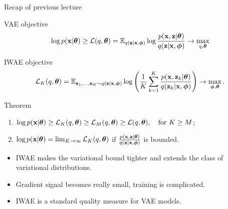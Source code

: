 \begin{frame}{Recap of previous lecture}
	\begin{block}{VAE objective}
		\vspace{-0.4cm}
		\[
			\log p(\mathbf{x} | \boldsymbol{\theta}) \geq \mathcal{L} (q, \boldsymbol{\theta})  = \mathbb{E}_{q(\mathbf{z} | \mathbf{x}, \boldsymbol{\phi})} \log \frac{p(\mathbf{x}, \mathbf{z} | \boldsymbol{\theta})}{q(\mathbf{z}| \mathbf{x}, \boldsymbol{\phi})} \rightarrow \max_{q, \boldsymbol{\theta}}
		\]
		\vspace{-0.5cm}
	\end{block}
	\begin{block}{IWAE objective}
		\vspace{-0.7cm}
		\[
		\mathcal{L}_K (q, \boldsymbol{\theta})  = \mathbb{E}_{\mathbf{z}_1, \dots, \mathbf{z}_K \sim q(\mathbf{z} | \mathbf{x}, \boldsymbol{\phi})} \log \left( \frac{1}{K}\sum_{k=1}^K\frac{p(\mathbf{x}, \mathbf{z}_k | \boldsymbol{\theta})}{q(\mathbf{z}_k| \mathbf{x}, \boldsymbol{\phi})} \right) \rightarrow \max_{\boldsymbol{\phi}, \boldsymbol{\theta}}.
		\]
		\vspace{-0.5cm}
	\end{block}
	\begin{block}{Theorem}
		\begin{enumerate}
			\item $\log p(\mathbf{x} | \boldsymbol{\theta}) \geq \mathcal{L}_K (q, \boldsymbol{\theta}) \geq \mathcal{L}_M (q, \boldsymbol{\theta}) \geq \mathcal{L} (q, \boldsymbol{\theta}), \quad \text{for } K \geq M$;
			\item $\log p(\mathbf{x} | \boldsymbol{\theta}) = \lim_{K \rightarrow \infty} \mathcal{L}_K (q, \boldsymbol{\theta})$ if $\frac{p(\mathbf{x}, \mathbf{z} | \boldsymbol{\theta})}{q(\mathbf{z} | \mathbf{x}, \boldsymbol{\phi})}$ is bounded.
		\end{enumerate}
	\end{block}
	\begin{itemize}
		\item IWAE makes the variational bound tighter and extends the class of variational distributions.
		\item Gradient signal becomes really small, training is complicated.
		\item IWAE is a standard quality measure for VAE models.
	\end{itemize}
\end{frame}
